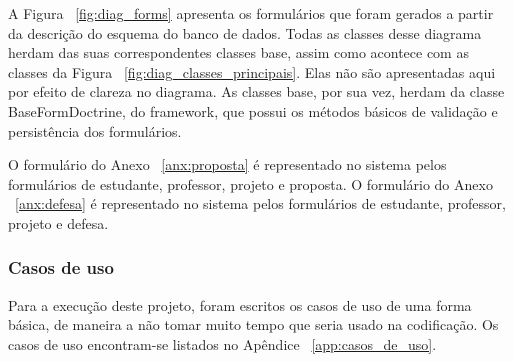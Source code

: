 A Figura ~\ref{fig:diag_forms} apresenta os formulários que foram gerados a partir da descrição 
do esquema do banco de dados. Todas as classes desse diagrama herdam das suas correspondentes 
classes base, assim como acontece com as classes da Figura ~\ref{fig:diag_classes_principais}.
Elas não são apresentadas aqui por efeito de clareza no diagrama. As classes base, por sua vez,
herdam da classe BaseFormDoctrine, do framework, que possui os métodos básicos de validação e 
persistência dos formulários. 

O formulário do Anexo ~\ref{anx:proposta} é representado no sistema pelos formulários de estudante, 
professor, projeto e proposta. O formulário do Anexo ~\ref{anx:defesa} é representado no sistema 
pelos formulários de estudante, professor, projeto e defesa. 

\subsubsection{Casos de uso}
Para a execução deste projeto, foram escritos os casos de uso de uma forma básica, de maneira a não
tomar muito tempo que seria usado na codificação. Os casos de uso encontram-se listados no Apêndice ~\ref{app:casos_de_uso}.
